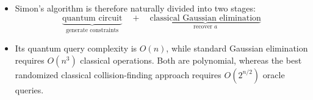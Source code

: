 \begin{takeawaysbox}
\begin{itemize}
        \item Simon's algorithm is therefore naturally divided into two
            stages:
            \begin{equation*}
                \underbrace{\text{quantum circuit}}_{\text{generate constraints}}
                \quad+\quad
                \underbrace{\text{classical Gaussian elimination}}_{\text{recover }a}
            \end{equation*}

        \item Its quantum query complexity is $O(n)$, while standard
            Gaussian elimination requires $O(n^3)$ classical operations.
            Both are polynomial, whereas the best randomized classical
            collision-finding approach requires $O(2^{n/2})$ oracle queries.
    \end{itemize}
\end{takeawaysbox}